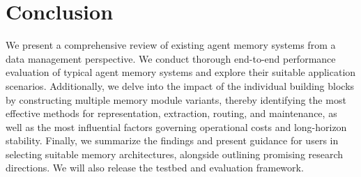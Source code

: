 \documentclass{llmxive}
\begin{document}

\section{Conclusion}
\label{sec:conclusion}

We present a comprehensive review of existing agent memory systems from a data management perspective. We conduct thorough end-to-end performance evaluation of typical agent memory systems and explore their suitable application scenarios. Additionally, we delve into the impact of the individual building blocks by constructing multiple memory module variants, thereby identifying the most effective methods for representation, extraction, routing, and maintenance, as well as the most influential factors governing operational costs and long-horizon stability. Finally, we summarize the findings and present guidance for users in selecting suitable memory architectures, alongside outlining promising research directions. We will also release the testbed and evaluation framework.



\balance




\end{document}
